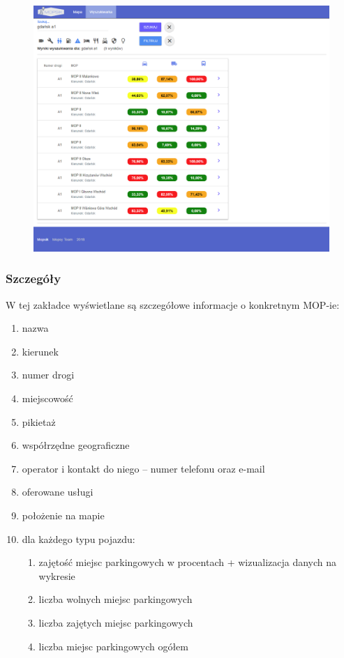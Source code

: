 \begin{figure}[!htb]
\centering
\includegraphics[width=\textwidth]{images/mopsik_www/search.png}
\label{mopsik_www_search}
\end{figure}

\subsubsection{Szczegóły}
W tej zakładce wyświetlane są szczegółowe informacje o konkretnym MOP-ie:
\begin{enumerate}
\item nazwa
\item kierunek
\item numer drogi
\item miejscowość
\item pikietaż
\item współrzędne geograficzne
\item operator i kontakt do niego -- numer telefonu oraz e-mail
\item oferowane usługi
\item położenie na mapie
\item dla każdego typu pojazdu:
\begin{enumerate}
\item zajętość miejsc parkingowych w procentach + wizualizacja danych na wykresie
\item liczba wolnych miejsc parkingowych
\item liczba zajętych miejsc parkingowych
\item liczba miejsc parkingowych ogółem
\end{enumerate}
\end{enumerate}


